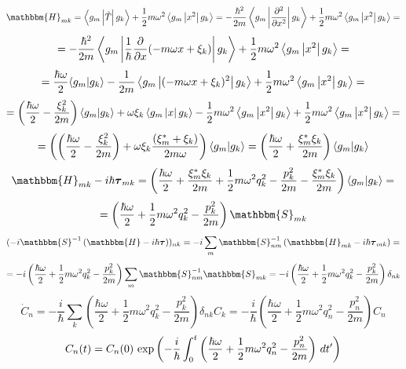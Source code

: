 $$\mathbbm{H}_{mk} = \mymean{g_m}{\hat{T}}{g_k} + \frac{1}{2}m\omega^2\mymean{g_m}{x^2}{g_k} =%
		     -\frac{\hbar^2}{2m}\mymean{g_m}{\frac{\partial^2}{\partial x^2}}{g_k} + \frac{1}{2}m\omega^2\mymean{g_m}{x^2}{g_k}=$$
$$=-\frac{\hbar^2}{2m}\left\langle g_m \left| \frac{1}{\hbar}\frac{\partial}{\partial x} (-m\omega x + \xi_k) \right| g_k \right\rangle + \frac{1}{2}m\omega^2\left\langle g_m \left| x^2 \right| g_k \right\rangle=$$
$$=\frac{\hbar\omega}{2}\langle g_m | g_k \rangle - \frac{1}{2m}\left\langle g_m \left| (-m\omega x + \xi_k)^2 \right| g_k \right\rangle + \frac{1}{2}m\omega^2\left\langle g_m \left| x^2 \right| g_k \right\rangle=$$
$$=\left(\frac{\hbar\omega}{2}-\frac{\xi_k^2}{2m}\right)\myint{g_m}{g_k}+\omega\xi_k\mymean{g_m}{x}{g_k}-%
	 \frac{1}{2}m\omega^2\mymean{g_m}{x^2}{g_k} + \frac{1}{2}m\omega^2\mymean{g_m}{x^2}{g_k}=$$
$$=\left(\left(\frac{\hbar\omega}{2}-\frac{\xi_k^2}{2m}\right)+\omega\xi_k\frac{(\xi_m^*+\xi_k)}{2m\omega}\right)\myint{g_m}{g_k}=%
   \left(\frac{\hbar\omega}{2}+\frac{\xi_m^*\xi_k}{2m}\right)\myint{g_m}{g_k}$$
$$\mathbbm{H}_{mk} - i\hbar\boldsymbol{\tau}_{mk} = \left( \frac{\hbar\omega}{2} + \frac{\xi_m^*\xi_k}{2m} + %
							   \frac{1}{2}m\omega^2q_k^2- \frac{p_k^2}{2m} -\frac{\xi_m^*\xi_k}{2m} \right)\myint{g_m}{g_k}=$$
$$=\left( \frac{\hbar\omega}{2} + \frac{1}{2}m\omega^2q_k^2 - \frac{p_k^2}{2m} \right)\mathbbm{S}_{mk}$$
$$( -i\mathbbm{S}^{-1}\left(\mathbbm{H}-i\hbar\boldsymbol{\tau}\right) )_{nk} = %
    -i\sum_m \mathbbm{S}^{-1}_{nm}\left( \mathbbm{H}_{mk} - i\hbar\boldsymbol{\tau}_{mk} \right) = $$
$$=-i\left( \frac{\hbar\omega}{2} +\frac{1}{2}m\omega^2q_k^2 - \frac{p_k^2}{2m} \right)\sum_m\mathbbm{S}^{-1}_{nm}\mathbbm{S}_{mk} = %
   -i\left( \frac{\hbar\omega}{2} +\frac{1}{2}m\omega^2q_k^2 - \frac{p_k^2}{2m} \right)\delta_{nk}$$
$$\dot{C}_n = -\frac{i}{\hbar}\sum_k \left(\frac{\hbar\omega}{2}+\frac{1}{2}m\omega^2q_k^2-\frac{p_k^2}{2m}\right)\delta_{nk}C_k=%
	      -\frac{i}{\hbar}\left(\frac{\hbar\omega}{2}+\frac{1}{2}m\omega^2q_n^2-\frac{p_n^2}{2m}\right)C_n$$
$$C_n(t) = C_n(0)\ \text{exp}\left( -\frac{i}{\hbar}\int_0^t\left(\frac{\hbar\omega}{2}+\frac{1}{2}m\omega^2q_n^2-\frac{p_n^2}{2m}\right)\,dt' \right)$$
